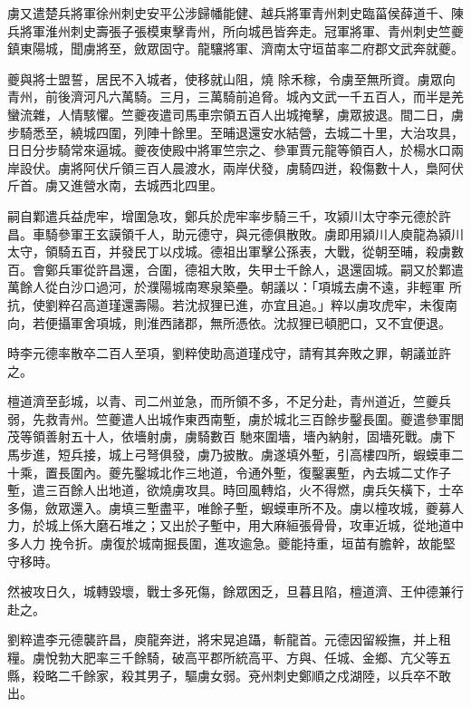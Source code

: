 \begin{pinyinscope}
 虜又遣楚兵將軍徐州刺史安平公涉歸幡能健、越兵將軍青州刺史臨菑侯薛道千、陳兵將軍淮州刺史壽張子張模東擊青州，所向城邑皆奔走。冠軍將軍、青州刺史竺夔鎮東陽城，聞虜將至，斂眾固守。龍驤將軍、濟南太守垣苗率二府郡文武奔就夔。



 夔與將士盟誓，居民不入城者，使移就山阻，燒
 除禾稼，令虜至無所資。虜眾向青州，前後濟河凡六萬騎。三月，三萬騎前追脅。城內文武一千五百人，而半是羌蠻流雜，人情駭懼。竺夔夜遣司馬車宗領五百人出城掩擊，虜眾披退。間二日，虜步騎悉至，繞城四圍，列陣十餘里。至晡退還安水結營，去城二十里，大治攻具，日日分步騎常來逼城。夔夜使殿中將軍竺宗之、參軍賈元龍等領百人，於楊水口兩岸設伏。虜將阿伏斤領三百人晨渡水，兩岸伏發，虜騎四迸，殺傷數十人，梟阿伏
 斤首。虜又進營水南，去城西北四里。



 嗣自鄴遣兵益虎牢，增圍急攻，鄭兵於虎牢率步騎三千，攻潁川太守李元德於許昌。車騎參軍王玄謨領千人，助元德守，與元德俱散敗。虜即用潁川人庾龍為潁川太守，領騎五百，并發民丁以戍城。德祖出軍擊公孫表，大戰，從朝至晡，殺虜數百。會鄭兵軍從許昌還，合圍，德祖大敗，失甲士千餘人，退還固城。嗣又於鄴遣萬餘人從白沙口過河，於濮陽城南寒泉築壘。朝議以：「項城去虜不遠，非輕軍
 所抗，使劉粹召高道瑾還壽陽。若沈叔狸已進，亦宜且追。」粹以虜攻虎牢，未復南向，若便攝軍舍項城，則淮西諸郡，無所憑依。沈叔狸已頓肥口，又不宜便退。



 時李元德率散卒二百人至項，劉粹使助高道瑾戍守，請宥其奔敗之罪，朝議並許之。



 檀道濟至彭城，以青、司二州並急，而所領不多，不足分赴，青州道近，竺夔兵弱，先救青州。竺夔遣人出城作東西南塹，虜於城北三百餘步鑿長圍。夔遣參軍閭茂等領善射五十人，依墻射虜，虜騎數百
 馳來圍墻，墻內納射，固墻死戰。虜下馬步進，短兵接，城上弓弩俱發，虜乃披散。虜遂填外塹，引高樓四所，蝦蟆車二十乘，置長圍內。夔先鑿城北作三地道，令通外塹，復鑿裏塹，內去城二丈作子塹，遣三百餘人出地道，欲燒虜攻具。時回風轉焰，火不得燃，虜兵矢橫下，士卒多傷，斂眾還入。虜填三塹盡平，唯餘子塹，蝦蟆車所不及。虜以橦攻城，夔募人力，於城上係大磨石堆之；又出於子塹中，用大麻絙張骨骨，攻車近城，從地道中多人力
 挽令折。虜復於城南掘長圍，進攻逾急。夔能持重，垣苗有膽幹，故能堅守移時。



 然被攻日久，城轉毀壞，戰士多死傷，餘眾困乏，旦暮且陷，檀道濟、王仲德兼行赴之。



 劉粹遣李元德襲許昌，庾龍奔迸，將宋晃追躡，斬龍首。元德因留綏撫，并上租糧。虜悅勃大肥率三千餘騎，破高平郡所統高平、方與、任城、金鄉、亢父等五縣，殺略二千餘家，殺其男子，驅虜女弱。兗州刺史鄭順之戍湖陸，以兵卒不敢出。




\end{pinyinscope}
